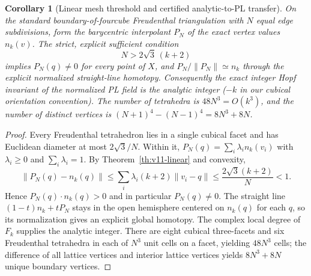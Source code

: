 \documentclass[aps,prd,onecolumn,notitlepage,11pt,superscriptaddress,longbibliography]{revtex4-2}
\newtheorem{corollary}{Corollary}
\begin{document}
\begin{corollary}[Linear mesh threshold and certified analytic-to-PL transfer]\label{co:v11-transfer}
On the standard boundary-of-fourcube Freudenthal triangulation with $N$ equal edge subdivisions, form the barycentric interpolant $P_N$ of the exact vertex values $n_k(v)$. The strict, explicit sufficient condition
\begin{equation}\label{eq:v11-resolution}
\boxed{\quad N>2\sqrt3\,(k+2)\quad}
\end{equation}
implies $P_N(q)\ne0$ for every point of $X$, and $P_N/\|P_N\|\simeq n_k$ through the \emph{explicit normalized straight-line homotopy}. Consequently the exact integer Hopf invariant of the normalized PL field is the analytic integer ($-k$ in our cubical orientation convention). The number of tetrahedra is $48N^3=O(k^3)$, and the number of distinct vertices is $(N+1)^4-(N-1)^4=8N^3+8N$.
\end{corollary}
\begin{proof}
Every Freudenthal tetrahedron lies in a single cubical facet and has Euclidean diameter at most $2\sqrt3/N$. Within it, $P_N(q)=\sum_i\lambda_i n_k(v_i)$ with $\lambda_i\ge0$ and $\sum_i\lambda_i=1$. By Theorem~\ref{th:v11-linear} and convexity,
\begin{equation}\label{eq:v11-error}
\|P_N(q)-n_k(q)\|\le\sum_i\lambda_i(k+2)\|v_i-q\|\le\frac{2\sqrt3(k+2)}{N}<1.
\end{equation}
Hence $P_N(q)\cdot n_k(q)>0$ and in particular $P_N(q)\ne0$. The straight line $(1-t)n_k+tP_N$ stays in the open hemisphere centered on $n_k(q)$ for each $q$, so its normalization gives an explicit global homotopy. The complex local degree of $F_k$ supplies the analytic integer. There are eight cubical three-facets and six Freudenthal tetrahedra in each of $N^3$ unit cells on a facet, yielding $48N^3$ cells; the difference of all lattice vertices and interior lattice vertices yields $8N^3+8N$ unique boundary vertices.
\end{proof}
\end{document}
